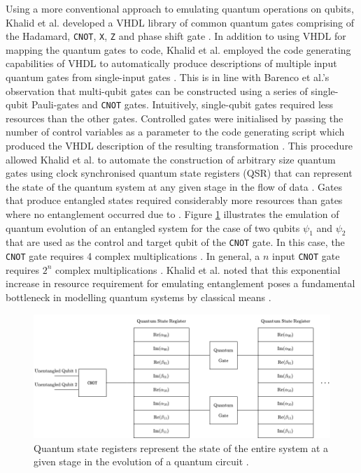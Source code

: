Using a more conventional approach to emulating quantum operations on qubits, Khalid et al. developed a VHDL library of common quantum gates comprising of the Hadamard, \texttt{CNOT}, \texttt{X}, \texttt{Z} and phase shift gate \cite{Khalid2004}. In addition to using VHDL for mapping the quantum gates to code, Khalid et al. employed the code generating capabilities of VHDL to automatically produce descriptions of multiple input quantum gates from single-input gates \cite{Khalid2004}. This is in line with Barenco et al.'s observation that multi-qubit gates can be constructed using a series of single-qubit Pauli-gates and \texttt{CNOT} gates. Intuitively, single-qubit gates required less resources than the other gates. Controlled gates were initialised by passing the number of control variables as a parameter to the code generating script which produced the VHDL description of the resulting transformation \cite{Khalid2004}. This procedure allowed Khalid et al. to automate the construction of arbitrary size quantum gates using clock synchronised quantum state registers (QSR) that can represent the state of the quantum system at any given stage in the flow of data \cite{Khalid2004}. Gates that produce entangled states required considerably more resources than gates where no entanglement occurred due to \cite{Khalid2004}. Figure \ref{fig:khalid-q-evo} illustrates the emulation of quantum evolution of an entangled system for the case of two qubits $\psi_1$ and $\psi_2$ that are used as the control and target qubit of the \texttt{CNOT} gate. In this case, the \texttt{CNOT} gate requires 4 complex multiplications \cite{Khalid2004}. In general, a $n$ input \texttt{CNOT} gate requires $2^n$ complex multiplications \cite{Khalid2004}. Khalid et al. noted that this exponential increase in resource requirement for emulating entanglement poses a fundamental bottleneck in modelling quantum systems by classical means \cite{Khalid2004}. 

\begin{figure}[!ht]
	\centering
	\includegraphics[width=1.0\linewidth]{body/ch3/figs/khalid-q-evo}
	\caption[Showing Use of Quantum Registers in a Quantum Circuit Evolution by Khalid et al.]{Quantum state registers represent the state of the entire system at a given stage in the evolution of a quantum circuit \cite{Khalid2004}.}
	\label{fig:khalid-q-evo}
\end{figure}

